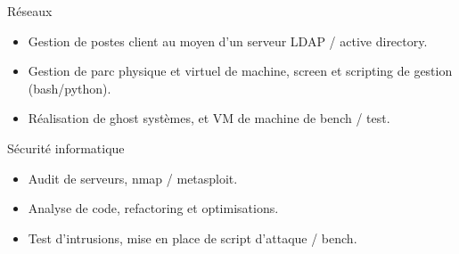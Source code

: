\documentclass[print]{GuillaumeSeren-cv}
\begin{document}
\begin{entrylist}
  \entryBul
  {Réseaux}
  {}
  {}
  {}
  {
     \begin{itemize}[leftmargin=*]
       \setlength\itemsep{0pt}
       \item Gestion de postes client au moyen d'un serveur LDAP / active directory.
       \item Gestion de parc physique et virtuel de machine, screen et scripting de gestion (bash/python).
       \item Réalisation de ghost systèmes, et VM de machine de bench / test.
     \end{itemize}
     }

  \entryBul
  {Sécurité informatique}
  {}
  {}
  {}
  {
     \begin{itemize}[leftmargin=*]
       \setlength\itemsep{0pt}
       \item Audit de serveurs, nmap / metasploit.
       \item Analyse de code, refactoring et optimisations.
       \item Test d'intrusions, mise en place de script d'attaque / bench.
     \end{itemize}
     }
\end{entrylist}

\newpage
\end{document}
